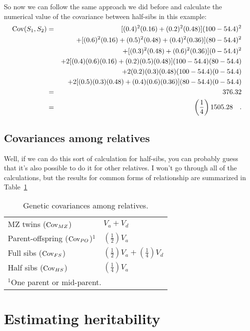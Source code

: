 So now we can follow the same approach we did before and calculate the
numerical value of the covariance between half-sibs in this example:
\begin{eqnarray*}
\mbox{Cov}(S_1,S_2) &=&\ [(0.4)^2(0.16) + (0.2)^2(0.48)](100 - 54.4)^2 \\
          && + [(0.6)^2(0.16) + (0.5)^2(0.48) + (0.4)^2(0.36)] (80 - 54.4)^2 \\
          && + [(0.3)^2(0.48) + (0.6)^2(0.36)](0 - 54.4)^2 \\
          && + 2[(0.4)(0.6)(0.16) + (0.2)(0.5)(0.48)](100 - 54.4)(80 - 54.4) \\
          && + 2(0.2)(0.3)(0.48)(100 - 54.4)(0 - 54.4) \\
          && + 2[(0.5)(0.3)(0.48) + (0.4)(0.6)(0.36)](80 - 54.4)(0 - 54.4) \\
         &=&\ 376.32 \\
         &=&\ \left({1 \over 4}\right)1505.28 \quad .
\end{eqnarray*}

\subsection*{Covariances among relatives}

Well, if we can do this sort of calculation for half-sibs, you can
probably guess that it's also possible to do it for other relatives. I
won't go through all of the calculations, but the results for common
forms of relationship are summarized in Table~\ref{table:relatives}

\begin{table}
\begin{center}
\begin{tabular}{ll}
\hline\hline
MZ twins ($\mbox{Cov}_{MZ}$) & $V_a + V_d$ \\
Parent-offspring ($\mbox{Cov}_{PO}$)$^1$ & $\left(\frac{1}{2}\right)V_a$ \\
Full sibs ($\mbox{Cov}_{FS}$) & $\left(\frac{1}{2}\right)V_a +
\left(\frac{1}{4}\right)V_d$ \\
Half sibs ($\mbox{Cov}_{HS}$) & $\left(\frac{1}{4}\right)V_a$ \\
\hline
\multicolumn{2}{l}{$^1$One parent or mid-parent.}
\end{tabular}
\end{center}
\caption{Genetic covariances among relatives.}\label{table:relatives}
\end{table}

\section*{Estimating heritability}

